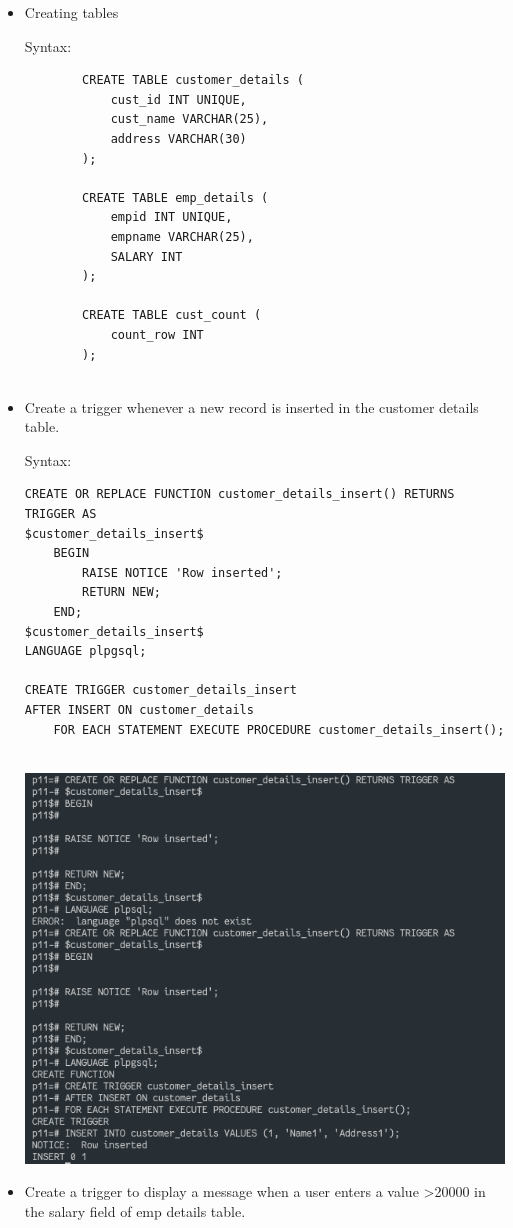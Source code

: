 \documentclass[13pt,oneside]{book}
\begin{document}
\begin{itemize}
	\item
	Creating tables
	 
	Syntax:
	\begin{verbatim}
		CREATE TABLE customer_details (
			cust_id INT UNIQUE,
			cust_name VARCHAR(25),
			address VARCHAR(30)
		);
		
		CREATE TABLE emp_details (
			empid INT UNIQUE,
			empname VARCHAR(25),
			SALARY INT
		);
		
		CREATE TABLE cust_count (
			count_row INT
		);
	
	\end{verbatim}
	
	
	\item
	Create a trigger whenever a new record is inserted in the customer details
	table.

	Syntax:
	\begin{verbatim}
CREATE OR REPLACE FUNCTION customer_details_insert() RETURNS TRIGGER AS
$customer_details_insert$
	BEGIN
		RAISE NOTICE 'Row inserted';
		RETURN NEW;
	END;
$customer_details_insert$
LANGUAGE plpgsql;

CREATE TRIGGER customer_details_insert
AFTER INSERT ON customer_details
	FOR EACH STATEMENT EXECUTE PROCEDURE customer_details_insert();
	
	\end{verbatim}
	\includegraphics[]{img/p11/ss1.png}
	
	
	\item
	Create a trigger to display a message when a user enters a value >20000
	in the salary field of emp details table.
	 

\end{itemize}
\end{document}
